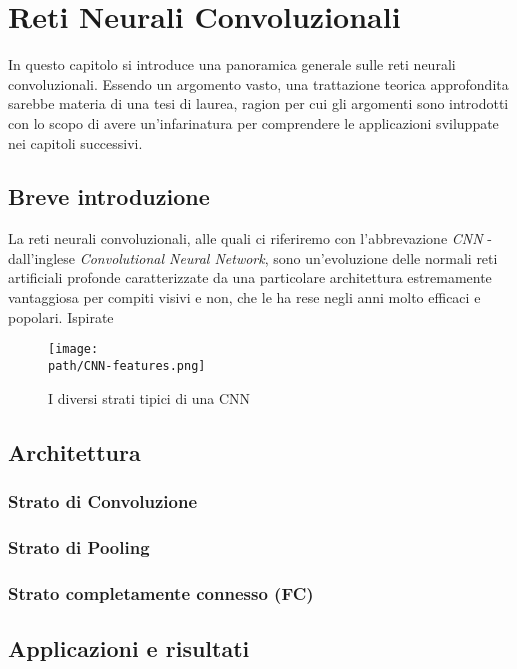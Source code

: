 
\chapter{Reti Neurali Convoluzionali} %
\label{Capitolo3}
\def \teoria {Figures/teoria}
\def \path	 {Figures/C3}
In questo capitolo si introduce una panoramica generale sulle reti neurali convoluzionali. Essendo un argomento vasto, una trattazione teorica approfondita sarebbe materia di una tesi di laurea, ragion per cui gli argomenti sono introdotti con lo scopo di avere un'infarinatura per comprendere le applicazioni sviluppate nei capitoli successivi. 
\section{Breve introduzione}
La reti neurali convoluzionali, alle quali ci riferiremo con l'abbrevazione \emph{CNN} - dall'inglese \emph{Convolutional Neural Network}, sono un'evoluzione delle normali reti artificiali profonde caratterizzate da una particolare architettura estremamente vantaggiosa per compiti visivi e non, che le ha rese negli anni molto efficaci e popolari. Ispirate 

\begin{figure}[h!]
 \centering
 \texttt{[image: \\path/CNN-features.png]} 
 \caption{I diversi strati tipici di una CNN}
 \label{fig:conv1}
\end{figure}


\section{Architettura}
\subsection{Strato di Convoluzione}

\subsection{Strato di Pooling}

\subsection{Strato completamente connesso (FC)}



\section{Applicazioni e risultati}


